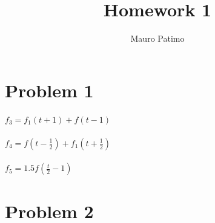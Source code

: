 \documentclass{article}
\begin{document}
\title{Homework 1}
\author{Mauro Patimo}

\maketitle

\section{Problem 1}
$f_3=f_1(t+1)+f(t-1)$ \\
\\
$f_4=f(t-\frac{1}{2})+f_1(t+\frac{1}{2})$ \\
\\
$f_5=1.5f(\frac{t}{2}-1)$
\section{Problem 2}
\end{document}
